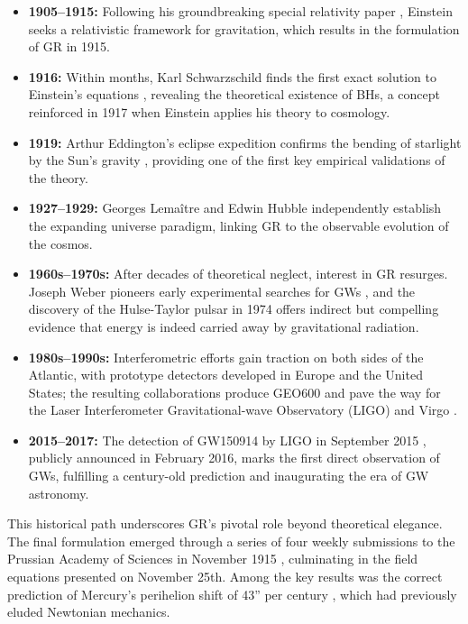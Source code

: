 \begin{itemize}
  \item \textbf{1905--1915:} Following his groundbreaking special relativity paper \cite{einstein1905originalpaper}, Einstein seeks a relativistic framework for gravitation, which results in the formulation of GR in 1915.
  
  \item \textbf{1916:} Within months, Karl Schwarzschild finds the first exact solution to Einstein's equations \cite{paperschwarzschild1916_pointmass}, revealing the theoretical existence of BHs, a concept reinforced in 1917 when Einstein applies his theory to cosmology.
  \item \textbf{1919:} Arthur Eddington’s eclipse expedition confirms the bending of starlight by the Sun’s gravity \cite{Eddingtonsexpedition}, providing one of the first key empirical validations of the theory. 
  \item \textbf{1927--1929:} Georges Lemaître \cite{LemaitreHubble} and Edwin Hubble \cite{Hubble1929} independently establish the expanding universe paradigm, linking GR to the observable evolution of the cosmos.
  \item \textbf{1960s--1970s:} After decades of theoretical neglect, interest in GR resurges. Joseph Weber pioneers early experimental searches for GWs \cite{JosephWeber}, and the discovery of the Hulse-Taylor pulsar in 1974 offers indirect but compelling evidence that energy is indeed carried away by gravitational radiation.
  \item \textbf{1980s--1990s:} Interferometric efforts gain traction on both sides of the Atlantic, with prototype detectors developed in Europe and the United States; the resulting collaborations produce GEO600 and pave the way for the Laser Interferometer Gravitational-wave Observatory (LIGO) and Virgo \cite{upgradeofGEO600}.
  \item \textbf{2015--2017:} The detection of GW150914 by LIGO in September 2015 \cite{GW150914}, publicly announced in February 2016, marks the first direct observation of GWs, fulfilling a century-old prediction and inaugurating the era of GW astronomy.
\end{itemize}

This historical path underscores GR's pivotal role beyond theoretical elegance. The final formulation emerged through a series of four weekly submissions to the Prussian Academy of Sciences in November 1915 \cite{Einstein1915Nov4, Einstein1915bNov11, Einstein1915cNov18, 
Einstein1915dNov25}, culminating in the field equations presented on November 25th. Among the key results was the correct prediction of Mercury's perihelion shift of 43'' per century \cite{Einstein1915cNov18}, which had previously eluded Newtonian mechanics.


